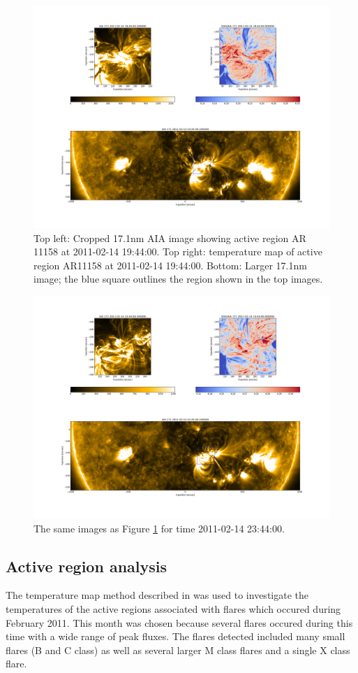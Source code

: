 \documentclass[referee,a4paper,12pt]{swsc}
\begin{document}
\begin{linenumbers}
\begin{figure}
	\centering
		\includegraphics[width=0.9\columnwidth]{20110214T194400with171.png}
	\caption{Top left: Cropped 17.1nm AIA image showing active region AR 11158 at 2011-02-14 19:44:00. Top right: temperature map of active region AR11158 at 2011-02-14 19:44:00. Bottom: Larger 17.1nm image; the blue square outlines the region shown in the top images.}
	\label{fig:trackdemo1}
\end{figure}
\begin{figure}
	\centering
		\includegraphics[width=0.9\columnwidth]{20110214T234400with171.png}
	\caption{The same images as Figure \ref{fig:trackdemo1} for time 2011-02-14 23:44:00.}
	\label{fig:trackdemo2}
\end{figure}

\subsection{Active region analysis}
The temperature map method described in  was used to investigate the temperatures of the active regions associated with flares which occured during February 2011. %
This month was chosen because several flares occured during this time with a wide range of peak fluxes. %
The flares detected included many small flares (B and C class) as well as several larger M class flares and a single X class flare. %


\end{linenumbers}
\end{document}
